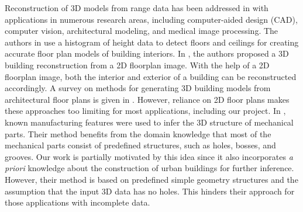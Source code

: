 \documentclass[10pt,journal,cspaper,compsoc]{IEEEtran}
\begin{document}
Reconstruction of 3D models from range data has been addressed in
\cite{RE_Fisher,RE_CLF,RE_CD} with applications in numerous research areas,
including computer-aided design (CAD), computer vision, architectural modeling,
and medical image processing.
The authors in \cite{Okorn10} use a histogram of height data to detect floors
and ceilings for creating accurate floor plan models of building interiors.
In \cite{DP_OWYC}, the authors proposed a 3D building reconstruction from a
2D floorplan image.
With the help of a 2D floorplan image, both the interior and exterior of a
building can be reconstructed accordingly.
A survey on methods for generating 3D building models from architectural
floor plans is given in \cite{YIN09}.
However, reliance on 2D floor plans makes these approaches too limiting for
most applications, including our project.
In \cite{RE_TOGSH}, known manufacturing features were used to infer the
3D structure of mechanical parts.
Their method benefits from the domain knowledge that most of the mechanical
parts consist of predefined structures, such as holes, bosses, and grooves.
Our work is partially motivated by this idea since it also incorporates
{\it a priori} knowledge about the construction of urban buildings for further
inference.
However, their method is based on predefined simple geometry structures and
the assumption that the input 3D data has no holes.
This hinders their approach for those applications with incomplete data.

\end{document}
